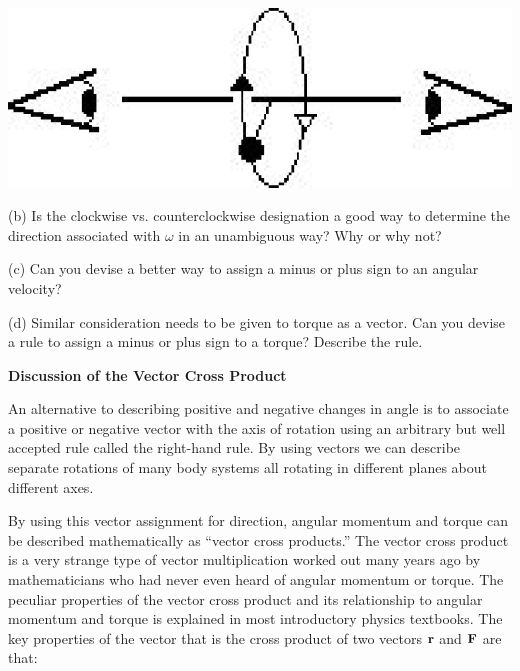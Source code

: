 \vspace{0.3cm}
{\par\raggedright \includegraphics{ang_mom_fig2.eps} \par}
\vspace{0.3cm}

(b) Is the clockwise vs. counterclockwise designation a good way to determine
the direction associated with $\omega$ in an unambiguous way? Why or why not? 
\vspace{20mm}

(c) Can you devise a better way to assign a minus or plus sign to an angular
velocity?
\vspace{20mm}

(d) Similar consideration needs to be given to torque as a vector. Can you devise
a rule to assign a minus or plus sign to a torque? Describe the rule.
\vspace{20mm}

\textbf{Discussion of the Vector Cross Product }

An alternative to describing positive and negative changes in angle is to associate
a positive or negative vector with the axis of rotation using an arbitrary but
well accepted rule called the right-hand rule. By using vectors we can describe
separate rotations of many body systems all rotating in different planes about
different axes. 

By using this vector assignment for direction, angular momentum and torque can
be described mathematically as ``vector cross products.'' The
vector cross product is a very strange type of vector multiplication worked
out many years ago by mathematicians who had never even heard of angular momentum
or torque. The peculiar properties of the vector cross product and its relationship
to angular momentum and torque is explained in most introductory physics textbooks.
The key properties of the vector that is the cross product of two vectors \( 
{\bf r} \)
and \( {\bf F} \) are that:

